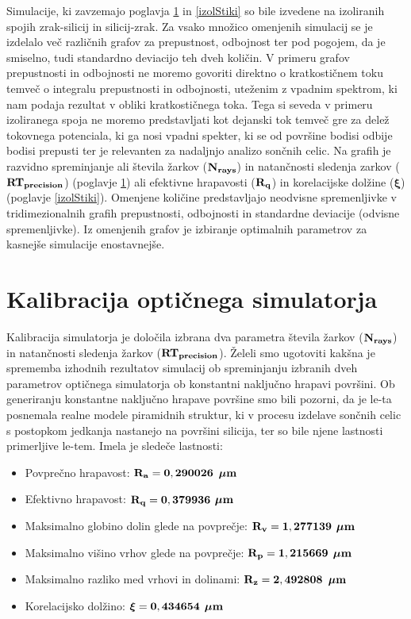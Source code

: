 \documentclass[a4paper,twoside,openright,12pt,slovene]{book}
\begin{document}
Simulacije, ki zavzemajo poglavja \ref{kalibSim} in \ref{izolStiki} so bile izvedene na izoliranih spojih zrak-silicij in silicij-zrak. Za vsako množico omenjenih simulacij se je izdelalo več različnih grafov za prepustnost, odbojnost ter pod pogojem, da je smiselno, tudi standardno deviacijo teh dveh količin. V primeru grafov prepustnosti in odbojnosti ne moremo govoriti direktno o kratkostičnem toku temveč o integralu prepustnosti in odbojnosti, uteženim z vpadnim spektrom, ki nam podaja rezultat v obliki kratkostičnega toka. Tega si seveda v primeru izoliranega spoja ne moremo predstavljati kot dejanski tok temveč gre za delež tokovnega potenciala, ki ga nosi vpadni spekter, ki se od površine bodisi odbije bodisi prepusti ter je relevanten za nadaljnjo analizo sončnih celic. Na grafih je razvidno spreminjanje ali števila žarkov ($\bf N_{rays}$) in natančnosti sledenja zarkov ($\bf RT_{precision}$) (poglavje \ref{kalibSim}) ali efektivne hrapavosti ($\bf R_{q}$) in korelacijske dolžine ($\boldsymbol{\xi}$) (poglavje \ref{izolStiki}). Omenjene količine predstavljajo neodvisne spremenljivke v tridimezionalnih grafih prepustnosti, odbojnosti in standardne deviacije (odvisne spremenljivke). Iz omenjenih grafov je izbiranje optimalnih parametrov za kasnejše simulacije enostavnejše.


\section{Kalibracija optičnega simulatorja}
\label{kalibSim}
Kalibracija simulatorja je določila izbrana dva parametra števila žarkov ($\bf N_{rays}$) in natančnosti sledenja žarkov ($\bf RT_{precision}$). Želeli smo ugotoviti kakšna je sprememba izhodnih rezultatov simulacij ob spreminjanju izbranih dveh parametrov optičnega simulatorja ob konstantni naključno hrapavi površini. Ob generiranju konstantne naključno hrapave površine smo bili pozorni, da je le-ta posnemala realne modele piramidnih struktur, ki v procesu izdelave sončnih celic s postopkom jedkanja nastanejo na površini silicija, ter so bile njene lastnosti primerljive le-tem. Imela je sledeče lastnosti:
\begin{itemize}
    \item Povprečno hrapavost: $\bf R_{a} = 0,290026$ $\bf \boldsymbol{\mu} m$
    \item Efektivno hrapavost: $\bf R_{q} = 0,379936$ $\bf \boldsymbol{\mu} m$
    \item Maksimalno globino dolin glede na povprečje: $\bf R_{v} = 1,277139$ $\bf \boldsymbol{\mu} m$
    \item Maksimalno višino vrhov glede na povprečje: $\bf R_{p} = 1,215669$ $\bf \boldsymbol{\mu} m$
    \item Maksimalno razliko med vrhovi in dolinami: $\bf R_{z} = 2,492808$ $\bf \boldsymbol{\mu} m$
    \item Korelacijsko dolžino: $\bf \boldsymbol{\xi} = 0,434654$ $\bf \boldsymbol{\mu} m$
\end{itemize}
\end{document}
